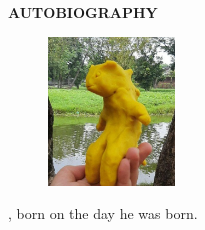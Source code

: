 \begin{center}
  \Large
  \textbf{AUTOBIOGRAPHY}
\end{center}


\vspace{2ex}

\begin{figure}
  \centering
  \vspace{-3ex}
  \includegraphics[width=0.3\textwidth]{figures/yellow.png}
  \vspace{-4ex}
\end{figure}

\name{}, born on the day he was born. \lipsum[1]

\lipsum[2]

